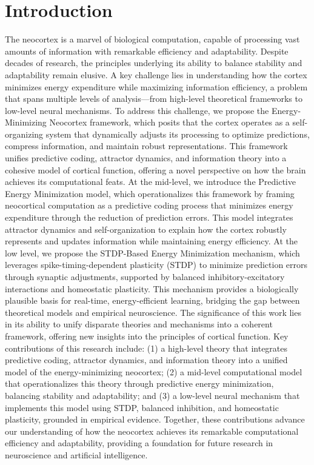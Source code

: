 \documentclass{article}
\begin{document}
\section{Introduction}
The neocortex is a marvel of biological computation, capable of processing vast amounts of information with remarkable efficiency and adaptability. Despite decades of research, the principles underlying its ability to balance stability and adaptability remain elusive. A key challenge lies in understanding how the cortex minimizes energy expenditure while maximizing information efficiency, a problem that spans multiple levels of analysis—from high-level theoretical frameworks to low-level neural mechanisms. To address this challenge, we propose the Energy-Minimizing Neocortex framework, which posits that the cortex operates as a self-organizing system that dynamically adjusts its processing to optimize predictions, compress information, and maintain robust representations. This framework unifies predictive coding, attractor dynamics, and information theory into a cohesive model of cortical function, offering a novel perspective on how the brain achieves its computational feats. At the mid-level, we introduce the Predictive Energy Minimization model, which operationalizes this framework by framing neocortical computation as a predictive coding process that minimizes energy expenditure through the reduction of prediction errors. This model integrates attractor dynamics and self-organization to explain how the cortex robustly represents and updates information while maintaining energy efficiency. At the low level, we propose the STDP-Based Energy Minimization mechanism, which leverages spike-timing-dependent plasticity (STDP) to minimize prediction errors through synaptic adjustments, supported by balanced inhibitory-excitatory interactions and homeostatic plasticity. This mechanism provides a biologically plausible basis for real-time, energy-efficient learning, bridging the gap between theoretical models and empirical neuroscience. The significance of this work lies in its ability to unify disparate theories and mechanisms into a coherent framework, offering new insights into the principles of cortical function. Key contributions of this research include: (1) a high-level theory that integrates predictive coding, attractor dynamics, and information theory into a unified model of the energy-minimizing neocortex; (2) a mid-level computational model that operationalizes this theory through predictive energy minimization, balancing stability and adaptability; and (3) a low-level neural mechanism that implements this model using STDP, balanced inhibition, and homeostatic plasticity, grounded in empirical evidence. Together, these contributions advance our understanding of how the neocortex achieves its remarkable computational efficiency and adaptability, providing a foundation for future research in neuroscience and artificial intelligence.
\end{document}
